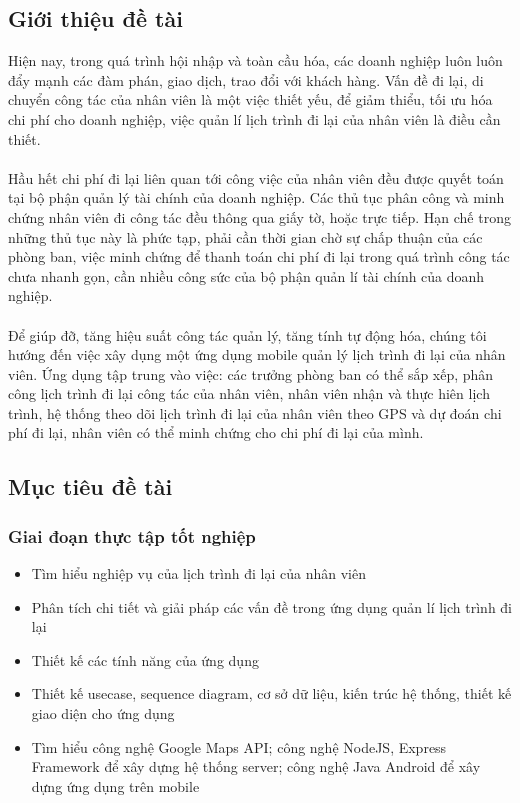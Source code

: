 \documentclass[a4paper]{article}
\begin{document}
\subsection{Giới thiệu đề tài}
Hiện nay, trong quá trình hội nhập và toàn cầu hóa, các doanh nghiệp luôn luôn đẩy mạnh các đàm phán, giao dịch, trao đổi với khách hàng. Vấn đề đi lại, di chuyển công tác của nhân viên là một việc thiết yếu, để giảm thiểu, tối ưu hóa chi phí cho doanh nghiệp, việc quản
lí lịch trình đi lại của nhân viên là điều cần thiết.\\
\\
Hầu hết chi phí đi lại liên quan tới công việc của nhân viên đều được quyết toán tại bộ phận quản lý tài chính của doanh nghiệp. Các thủ tục phân công và minh chứng nhân viên đi công tác đều thông qua giấy tờ, hoặc trực tiếp. Hạn chế trong những thủ tục này là phức tạp,
phải cần thời gian chờ sự chấp thuận của các phòng ban, việc minh chứng để thanh toán chi phí đi lại trong quá trình công tác chưa nhanh gọn, cần nhiều công sức của bộ phận quản lí tài chính của doanh nghiệp.\\
\\
Để giúp đỡ, tăng hiệu suất công tác quản lý, tăng tính tự động hóa, chúng tôi hướng đến việc xây dụng một ứng dụng mobile quản lý lịch trình đi lại của nhân viên. Ứng dụng tập trung vào việc: các trưởng phòng ban có thể sắp xếp, phân công lịch trình đi lại công tác của
nhân viên, nhân viên nhận và thực hiên lịch trình, hệ thống theo dõi lịch trình đi lại của nhân viên theo GPS và dự đoán chi phí đi lại, nhân viên có thể minh chứng cho chi phí đi lại của mình.
\subsection{Mục tiêu đề tài}
\subsubsection{Giai đoạn thực tập tốt nghiệp}
\begin{itemize}    
    \item Tìm hiểu nghiệp vụ của lịch trình đi lại của nhân viên
    \item Phân tích chi tiết và giải pháp các vấn đề trong ứng dụng quản lí lịch trình đi lại
    \item Thiết kế các tính năng của ứng dụng
    \item Thiết kế usecase, sequence diagram, cơ sở dữ liệu, kiến trúc hệ thống, thiết kế giao diện cho ứng dụng
    \item Tìm hiểu công nghệ Google Maps API; công nghệ NodeJS, Express Framework để xây dựng hệ thống server; công nghệ Java Android để xây dựng ứng dụng trên mobile
\end{itemize}
\end{document}
